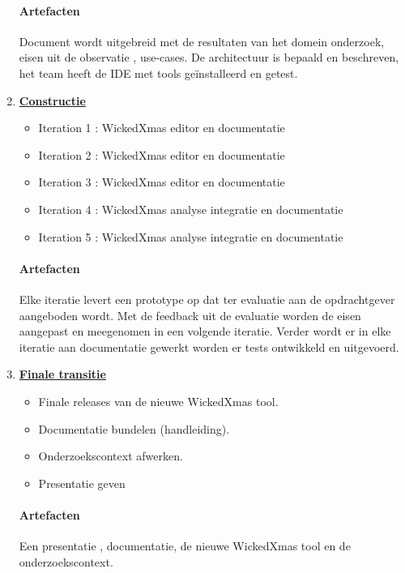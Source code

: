 \begin{enumerate}
	\paragraph{Artefacten}
	Document wordt uitgebreid met de resultaten van het domein onderzoek, eisen uit
	de observatie , use-cases. De architectuur is bepaald en beschreven, het team
	heeft de IDE met tools ge\"{i}nstalleerd en getest.

\item \underline{\textbf{Constructie}}
		\begin{itemize}
			\item Iteration 1 : WickedXmas editor en documentatie
			\item Iteration 2 : WickedXmas editor en documentatie
			\item Iteration 3 : WickedXmas editor en documentatie
			\item Iteration 4 : WickedXmas analyse integratie en documentatie
			\item Iteration 5 : WickedXmas analyse integratie en documentatie
		\end{itemize}

		\paragraph{Artefacten}
		Elke iteratie levert een prototype op dat ter evaluatie aan de
		opdrachtgever aangeboden wordt. Met de feedback uit de evaluatie
		worden de eisen aangepast en meegenomen in een volgende iteratie.
		Verder wordt er in elke iteratie aan documentatie gewerkt worden
		er tests ontwikkeld en uitgevoerd.

\item \underline{\textbf{Finale transitie}}
	\begin{itemize}
		\item Finale releases van de nieuwe WickedXmas tool.
		\item Documentatie bundelen (handleiding).
		\item Onderzoekscontext afwerken.
		\item Presentatie geven
	\end{itemize}
	\paragraph{Artefacten}
	Een presentatie , documentatie, de nieuwe WickedXmas tool en de onderzoekscontext.

\end{enumerate}